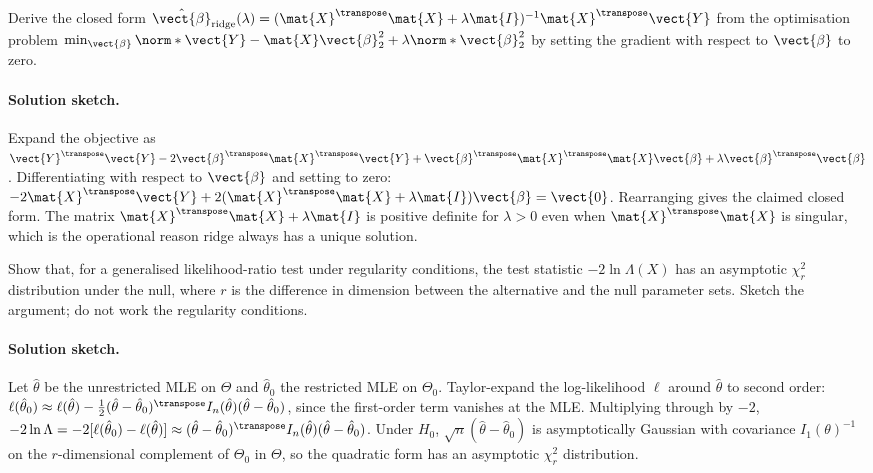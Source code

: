 \begin{exercise}
Derive the closed form $\hat{\vect{\beta}}_{\mathrm{ridge}}(\lambda)
= (\mat{X}^{\transpose}\mat{X} + \lambda \mat{I})^{-1}
\mat{X}^{\transpose}\vect{Y}$ from the optimisation problem
$\min_{\vect{\beta}} \norm*{\vect{Y} - \mat{X}\vect{\beta}}_{2}^{2}
+ \lambda \norm*{\vect{\beta}}_{2}^{2}$ by setting the gradient
with respect to $\vect{\beta}$ to zero.

\paragraph{Solution sketch.} Expand the objective as
$\vect{Y}^{\transpose}\vect{Y} - 2\vect{\beta}^{\transpose}
\mat{X}^{\transpose}\vect{Y} + \vect{\beta}^{\transpose}
\mat{X}^{\transpose}\mat{X}\vect{\beta} + \lambda
\vect{\beta}^{\transpose}\vect{\beta}$. Differentiating with
respect to $\vect{\beta}$ and setting to zero:
$-2\mat{X}^{\transpose}\vect{Y} + 2(\mat{X}^{\transpose}\mat{X}
+ \lambda \mat{I})\vect{\beta} = \vect{0}$. Rearranging gives
the claimed closed form. The matrix $\mat{X}^{\transpose}\mat{X}
+ \lambda\mat{I}$ is positive definite for $\lambda > 0$ even
when $\mat{X}^{\transpose}\mat{X}$ is singular, which is the
operational reason ridge always has a unique solution.
\end{exercise}

\begin{exercise}
Show that, for a generalised likelihood-ratio test under regularity
conditions, the test statistic $-2\ln\Lambda(X)$ has an asymptotic
$\chi^{2}_{r}$ distribution under the null, where $r$ is the
difference in dimension between the alternative and the null
parameter sets. Sketch the argument; do not work the regularity
conditions.

\paragraph{Solution sketch.} Let $\hat{\theta}$ be the
unrestricted MLE on $\Theta$ and $\hat{\theta}_{0}$ the
restricted MLE on $\Theta_{0}$. Taylor-expand the log-likelihood
$\ell$ around $\hat{\theta}$ to second order:
$\ell(\hat{\theta}_{0}) \approx \ell(\hat{\theta}) - \frac{1}{2}
(\hat{\theta} - \hat{\theta}_{0})^{\transpose} I_{n}(\hat{\theta})
(\hat{\theta} - \hat{\theta}_{0})$, since the first-order term
vanishes at the MLE. Multiplying through by $-2$,
$-2\ln\Lambda = -2[\ell(\hat{\theta}_{0}) - \ell(\hat{\theta})]
\approx (\hat{\theta} - \hat{\theta}_{0})^{\transpose}
I_{n}(\hat{\theta}) (\hat{\theta} - \hat{\theta}_{0})$. Under
$H_{0}$, $\sqrt{n}(\hat{\theta} - \hat{\theta}_{0})$ is
asymptotically Gaussian with covariance $I_{1}(\theta)^{-1}$ on
the $r$-dimensional complement of $\Theta_{0}$ in $\Theta$, so
the quadratic form has an asymptotic $\chi^{2}_{r}$ distribution.
\end{exercise}

